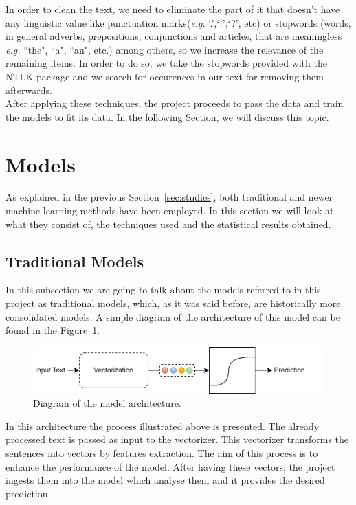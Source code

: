 In order to clean the text, we need to eliminate the part of it that doesn't have any linguistic value like punctuation marks(\textit{e.g.} `.',`!',`?', etc) or stopwords (words, in general adverbs, prepositions, conjunctions and articles, that are meaningless \textit{e.g.} ``the", ``a", ``an", etc.) among others, so we increase the relevance of the remaining items. In order to do so, we take the stopwords provided with the NTLK package and we search for occurences in our text for removing them afterwards.\\


After applying these techniques, the project proceeds to pass the data and train the models to fit its data. In the following Section, we will discuss this topic.

\section{Models}
As explained in the previous Section~\ref{sec:studies}, both traditional and newer machine learning methods have been employed. In this section we will look at what they consist of, the techniques used and the statistical results obtained.


\label{sec:models}
\subsection{Traditional Models}

In this subsection we are going to talk about the models referred to in this project as traditional models, which, as it was said before, are historically more consolidated models. A simple diagram of the architecture of this model can be found in the Figure~\ref{fig:modelarch}.


\begin{figure}[!htp]
    \centering
    \includegraphics[scale=0.4]{img/detection/ModelArchitecture.png}
    \caption{Diagram of the model architecture.}
    \label{fig:modelarch}
\end{figure}

In this architecture the process illustrated above is presented. The already processed text is passed as input to the vectorizer. This vectorizer transforms the sentences into vectors by features extraction. The aim of this process is to enhance the performance of the model. After having these vectors, the project ingests them into the model which analyse them and it provides the desired prediction.

